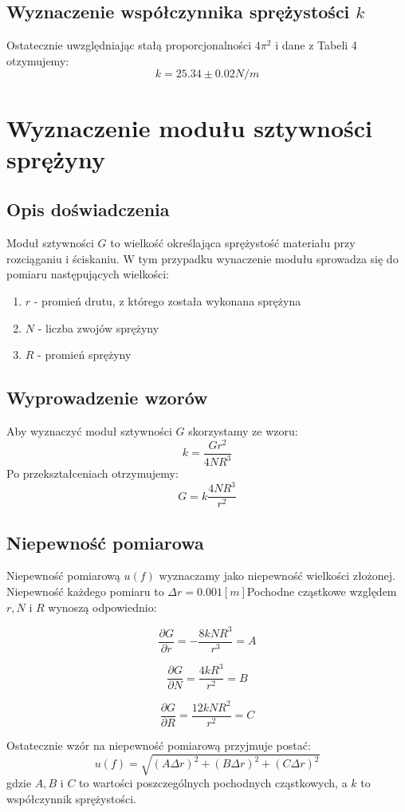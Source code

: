 \documentclass{article} %
\begin{document}
\subsection{Wyznaczenie współczynnika sprężystości $k$}
Ostatecznie uwzględniając stałą proporcjonalności $4\pi^2$ i dane z Tabeli 4 otzymujemy:
{\large
\begin{equation}
    k = 25.34\pm0.02N/m
\end{equation}
}
\section{Wyznaczenie modułu sztywności sprężyny}
\subsection{Opis doświadczenia}
Moduł sztywności $G$ to wielkość określająca sprężystość materiału przy rozciąganiu i ściskaniu. W tym przypadku wynaczenie modułu sprowadza się do pomiaru następujących wielkości:
\begin{enumerate}
    \item $r$ - promień drutu, z którego została wykonana sprężyna
    \item $N$ - liczba zwojów sprężyny
    \item $R$ - promień sprężyny
\end{enumerate}
\subsection{Wyprowadzenie wzorów}
Aby wyznaczyć moduł sztywności $G$ skorzystamy ze wzoru:
{\large
\begin{equation}
    k = \frac{Gr^2}{4NR^3}
\end{equation}
}
Po przekształceniach otrzymujemy:
{\large
\begin{equation}
    G = k\frac{4NR^3}{r^2}
\end{equation}
}
\subsection{Niepewność pomiarowa}
Niepewność pomiarową $u(f)$ wyznaczamy jako niepewność wielkości złożonej. Niepewność każdego pomiaru to $\Delta r = 0.001[m]$Pochodne cząstkowe względem $r, N$ i $R$ wynoszą odpowiednio:
{\large
\begin{equation}
    \frac{\partial G}{\partial r} = -\frac{8kNR^3}{r^3} = A
\end{equation}

\begin{equation}
    \frac{\partial G}{\partial N} = \frac{4kR^3}{r^2} = B
\end{equation}

\begin{equation}
    \frac{\partial G}{\partial R} = \frac{12kNR^2}{r^2} = C
\end{equation}
}
Ostatecznie wzór na niepewność pomiarową przyjmuje postać:
{\large
\begin{equation}
    u(f) = \sqrt{(A\Delta r)^2+(B\Delta r)^2+(C\Delta r)^2}
\end{equation}
}
gdzie $A, B$ i $C$ to wartości poszczególnych pochodnych cząstkowych, a $k$ to współczynnik sprężystości.
\end{document}
